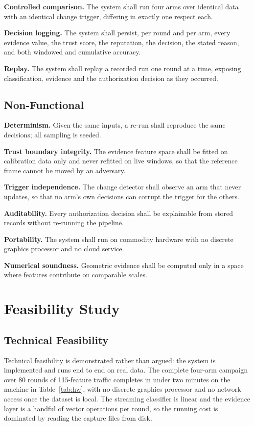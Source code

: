 \documentclass[12pt,a4paper]{report}
\begin{document}
\textbf{Controlled comparison.} The system shall run four arms over identical
data with an identical change trigger, differing in exactly one respect each.

\textbf{Decision logging.} The system shall persist, per round and per arm, every
evidence value, the trust score, the reputation, the decision, the stated reason,
and both windowed and cumulative accuracy.

\textbf{Replay.} The system shall replay a recorded run one round at a time,
exposing classification, evidence and the authorization decision as they
occurred.

\subsection{Non-Functional}

\textbf{Determinism.} Given the same inputs, a re-run shall reproduce the same
decisions; all sampling is seeded.

\textbf{Trust boundary integrity.} The evidence feature space shall be fitted on
calibration data only and never refitted on live windows, so that the reference
frame cannot be moved by an adversary.

\textbf{Trigger independence.} The change detector shall observe an arm that
never updates, so that no arm's own decisions can corrupt the trigger for the
others.

\textbf{Auditability.} Every authorization decision shall be explainable from
stored records without re-running the pipeline.

\textbf{Portability.} The system shall run on commodity hardware with no discrete
graphics processor and no cloud service.

\textbf{Numerical soundness.} Geometric evidence shall be computed only in a
space where features contribute on comparable scales.

\section{Feasibility Study}

\subsection{Technical Feasibility}

Technical feasibility is demonstrated rather than argued: the system is
implemented and runs end to end on real data. The complete four-arm campaign over
80 rounds of 115-feature traffic completes in under two minutes on the machine in
Table~\ref{tab:hw}, with no discrete graphics processor and no network access
once the dataset is local. The streaming classifier is linear and the evidence
layer is a handful of vector operations per round, so the running cost is
dominated by reading the capture files from disk.
\end{document}
